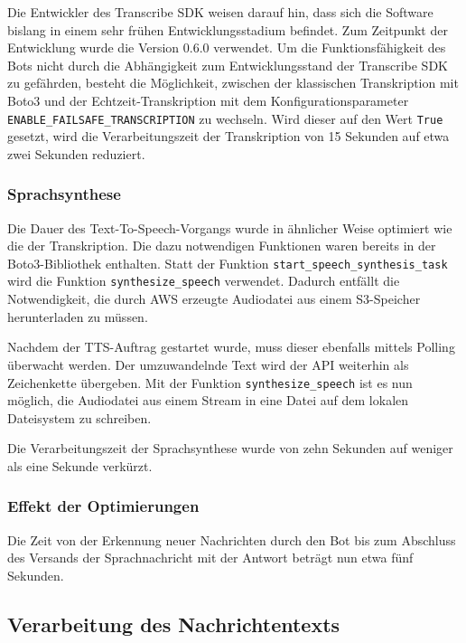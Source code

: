 Die Entwickler des Transcribe SDK weisen darauf hin, dass sich die Software bislang in einem sehr frühen Entwicklungsstadium befindet. Zum Zeitpunkt der Entwicklung wurde die Version 0.6.0 verwendet. Um die Funktionsfähigkeit des Bots nicht durch die Abhängigkeit zum Entwicklungsstand der Transcribe SDK zu gefährden, besteht die Möglichkeit, zwischen der klassischen Transkription mit Boto3 und der Echtzeit-Transkription mit dem Konfigurationsparameter \lstinline{ENABLE_FAILSAFE_TRANSCRIPTION} zu wechseln. Wird dieser auf den Wert \lstinline{True} gesetzt, wird die Verarbeitungszeit der Transkription von 15 Sekunden auf etwa zwei Sekunden reduziert.

\subsubsection{Sprachsynthese}
\label{sec:optimierung-synth}

Die Dauer des Text-To-Speech-Vorgangs wurde in ähnlicher Weise optimiert wie die der Transkription. Die dazu notwendigen Funktionen waren bereits in der Boto3-Bibliothek enthalten. Statt der Funktion \lstinline{start_speech_synthesis_task} wird die Funktion \lstinline{synthesize_speech} verwendet. Dadurch entfällt die Notwendigkeit, die durch AWS erzeugte Audiodatei aus einem S3-Speicher herunterladen zu müssen. 

Nachdem der TTS-Auftrag gestartet wurde, muss dieser ebenfalls mittels Polling überwacht werden. Der umzuwandelnde Text wird der API weiterhin als Zeichenkette übergeben. Mit der Funktion \lstinline{synthesize_speech} ist es nun möglich, die Audiodatei aus einem Stream in eine Datei auf dem lokalen Dateisystem zu schreiben. 

Die Verarbeitungszeit der Sprachsynthese wurde von zehn Sekunden auf weniger als eine Sekunde verkürzt.

\subsubsection{Effekt der Optimierungen}

Die Zeit von der Erkennung neuer Nachrichten durch den Bot bis zum Abschluss des Versands der Sprachnachricht mit der Antwort beträgt nun etwa fünf Sekunden.

\subsection{Verarbeitung des Nachrichtentexts}

